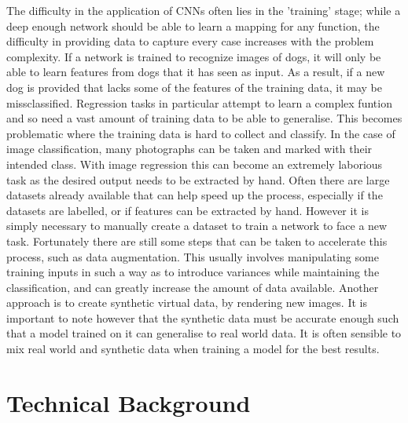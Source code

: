 \documentclass[ %
                    author={Gavin Parker},
                supervisor={Dr. Neill Campbell},
                    degree={MEng},
                     title={Deep Siamese Networks for Illumination Estimation from Stereo Images},
                  subtitle={},
                      type={research},
                      year={2018} ]{dissertation}
\begin{document}
The difficulty in the application of CNNs often lies in the 'training' stage; while a deep enough network should be able to learn a mapping for any function, the difficulty in providing data to capture every case increases with the problem complexity. If a network is trained to recognize images of dogs, it will only be able to learn features from dogs that it has seen as input. As a result, if a new dog is provided that lacks some of the features of the training data, it may be missclassified. Regression tasks in particular attempt to learn a complex funtion and so need a vast amount of training data to be able to generalise. This becomes problematic where the training data is hard to collect and classify. In the case of image classification, many photographs can be taken and marked with their intended class. With image regression this can become an extremely laborious task as the desired output needs to be extracted by hand. Often there are large datasets already available that can help speed up the process, especially if the datasets are labelled, or if features can be extracted by hand. However it is simply necessary to manually create a dataset to train a network to face a new task. Fortunately there are still some steps that can be taken to accelerate this process, such as data augmentation. This usually involves manipulating some training inputs in such a way as to introduce variances while maintaining the classification, and can greatly increase the amount of data available. Another approach is to create synthetic virtual data, by rendering new images. It is important to note however that the synthetic data must be accurate enough such that a model trained on it can generalise to real world data. It is often sensible to mix real world and synthetic data when training a model for the best results.



\chapter{Technical Background}
\label{chap:technical}
\end{document}
